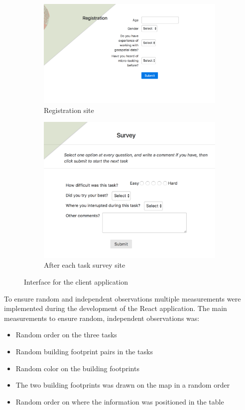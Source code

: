\begin{figure}[H]
	\centering
	\begin{subfigure}[b]{0.40\textwidth}
		\centering
		\includegraphics[width=\linewidth]{fig/mt-registration}
		\caption{Registration site}
		\label{fig:mt-registration}
	\end{subfigure}
	\begin{subfigure}[b]{0.35\textwidth}
		\centering
		\includegraphics[width=\linewidth]{fig/mt-survey}
		\caption{After each task survey site}
		\label{fig:mt-survey}
	\end{subfigure}
	\caption{Interface for the client application}
	\label{fig:client-interface}
\end{figure}
       
To ensure random and independent observations multiple measurements were implemented during the development of the React application. The main measurements to ensure random, independent observations was:
\begin{itemize}
	\item Random order on the three tasks
	\item Random building footprint pairs in the tasks
	\item Random color on the building footprints
	\item The two building footprints was drawn on the map in a random order
	\item Random order on where the information was positioned in the table
\end{itemize}

